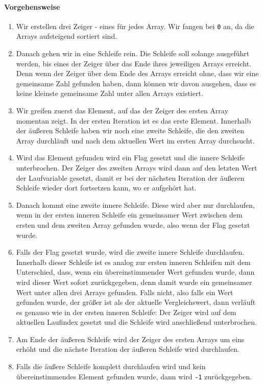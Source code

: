 \documentclass{book}
\begin{document}
\paragraph{Vorgehensweise}
\begin{enumerate}
	\item Wir erstellen drei Zeiger - eines für jedes Array. Wir fangen bei \lstinline|0| an, da die Arrays aufsteigend sortiert sind.
	\item Danach gehen wir in eine Schleife rein. Die Schleife soll solange ausgeführt werden, bis eines der Zeiger über das Ende ihres jeweiligen Arrays erreicht. Denn wenn der Zeiger über dem Ende des Arrays erreicht ohne, dass wir eine gemeinsame Zahl gefunden haben, dann können wir davon ausgehen, dass es keine kleinste gemeinsame Zahl unter allen Arrays existiert.
	\item Wir greifen zuerst das Element, auf das der Zeiger des ersten Array momentan zeigt. In der ersten Iteration ist es das erste Element. Innerhalb der äußeren Schleife haben wir noch eine zweite Schleife, die den zweiten Array durchläuft und nach dem aktuellen Wert im ersten Array durchsucht. 
	\item Wird das Element gefunden wird ein Flag gesetzt und die innere Schleife unterbrochen. Der Zeiger des zweiten Arrays wird dann auf den letzten Wert der Laufvariable gesetzt, damit er bei der nächsten Iteration der äußeren Schleife wieder dort fortsetzen kann, wo er aufgehört hat.
	\item Danach kommt eine zweite innere Schleife. Diese wird aber nur durchlaufen, wenn in der ersten inneren Schleife ein gemeinsamer Wert zwischen dem ersten und dem zweiten Array gefunden wurde, also wenn der Flag gesetzt wurde.
	\item Falls der Flag gesetzt wurde, wird die zweite innere Schleife durchlaufen. Innerhalb dieser Schleife ist es analog zur ersten inneren Schleifen mit dem Unterschied, dass, wenn ein übereinstimmender Wert gefunden wurde, dann wird dieser Wert sofort zurückgegeben, denn damit wurde ein gemeinsamer Wert unter allen drei Arrays gefunden. Falls nicht, also falls ein Wert gefunden wurde, der größer ist als der aktuelle Vergleichswert, dann verläuft es genauso wie in der ersten inneren Schleife: Der Zeiger wird auf dem aktuellen Laufindex gesetzt und die Schleife wird anschließend unterbrochen.
	\item Am Ende der äußeren Schleife wird der Zeiger des ersten Arrays um eins erhöht und die nächste Iteration der äußeren Schleife wird durchlaufen.
	\item Falls die äußere Schleife komplett durchlaufen wird und kein übereinstimmendes Element gefunden wurde, dann wird \lstinline|-1| zurückgegeben.	
\end{enumerate}
\end{document}
